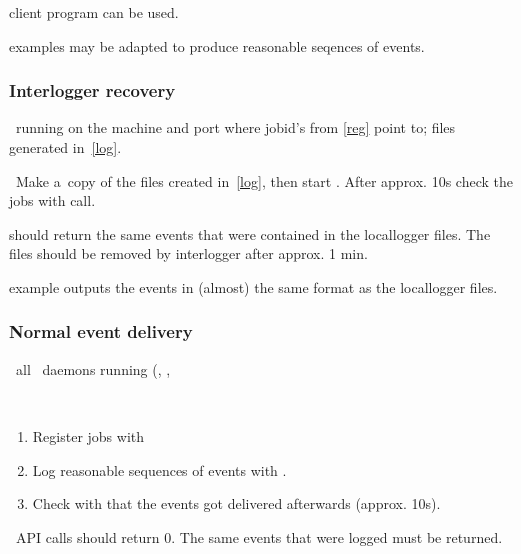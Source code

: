 \begin{hints}
 client program can be used.

 examples may be adapted to produce reasonable seqences
of events.
\end{hints}

\subsubsection{Interlogger recovery}
\label{recover}
\req\ running  on the machine and port where 
jobid's from \ref{reg} point to; files generated in~\ref{log}.

\how\ Make a~copy of the files created in~\ref{log}, then start
. After approx. 10s check the jobs
with  call. 

\result {} should return the same events that were
contained in the locallogger files. The files should be removed by 
interlogger after approx. 1 min.

\begin{hints}
 example outputs the events in (almost) the same
format as the locallogger files.
\end{hints}

\subsubsection{Normal event delivery}
\label{normal}
\req\ all \LB\ daemons running (, ,

\how\
\begin{enumerate}

\item Register jobs with  
\item Log reasonable sequences of events with .
\item Check with \code{edg\_wll\_JobLog}
that the events got delivered afterwards (approx. 10s).
\end{enumerate}

\result\ API calls should return 0. The same events that were logged must be returned.

